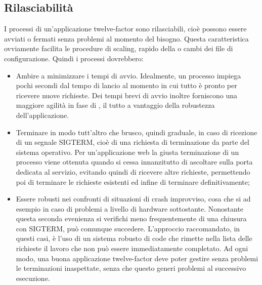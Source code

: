\documentclass[PianoDiQualifica.tex]{subfiles}
\begin{document}
\subsection{Rilasciabilità}
I processi di un'applicazione twelve-factor sono rilasciabili, cioè possono essere avviati o fermati senza problemi al momento del bisogno. Questa caratteristica ovviamente facilita le procedure di scaling,  rapido della  o cambi dei file di configurazione.
Quindi i processi dovrebbero:
\begin{itemize}
\item Ambire a minimizzare i tempi di avvio. Idealmente, un processo impiega pochi secondi dal tempo di lancio al momento in cui tutto è pronto per ricevere nuove richieste. Dei tempi brevi di avvio inoltre forniscono una maggiore agilità in fase di , il tutto a vantaggio della robustezza dell'applicazione.
\item Terminare in modo tutt'altro che brusco, quindi graduale, in caso di ricezione di un segnale SIGTERM, cioè di una richiesta di terminazione da parte del sistema operativo. Per un'applicazione web la giusta terminazione di un processo viene ottenuta quando si cessa innanzitutto di ascoltare sulla porta dedicata al servizio, evitando quindi di ricevere altre richieste, permettendo poi di terminare le richieste esistenti ed infine di terminare definitivamente;
\item Essere robusti nei confronti di situazioni di crash improvviso, cosa che si  ad esempio in caso di problemi a livello di hardware sottostante. Nonostante questa seconda evenienza si verifichi meno frequentemente di una chiusura con SIGTERM, può comunque succedere. L'approccio raccomandato, in questi casi, è l'uso di un sistema robusto di code che rimette nella lista delle richieste il lavoro che non può essere immediatamente completato. Ad ogni modo, una buona applicazione twelve-factor deve poter gestire senza problemi le terminazioni inaspettate, senza che questo generi problemi al successivo esecuzione.
\end{itemize}
\end{document}
